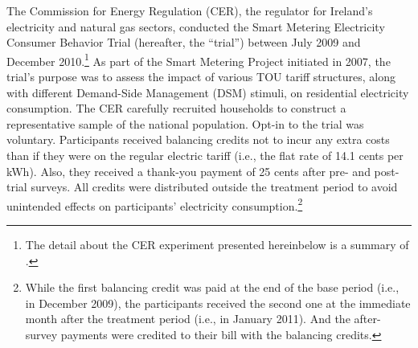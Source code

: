 The Commission for Energy Regulation (CER), the regulator for Ireland's electricity and natural gas sectors, conducted the Smart Metering Electricity Consumer Behavior Trial (hereafter, the ``trial'') between July 2009 and December 2010.\footnote{The detail about the CER experiment presented hereinbelow is a summary of \cite{Electricity-Smart-Metering-Customer-Behaviour-Trials-Findings-Report_CER_2011}.} As part of the Smart Metering Project initiated in 2007, the trial's purpose was to assess the impact of various TOU tariff structures, along with different Demand-Side Management (DSM) stimuli, on residential electricity consumption. The CER carefully recruited households to construct a representative sample of the national population. Opt-in to the trial was voluntary. Participants received balancing credits not to incur any extra costs than if they were on the regular electric tariff (i.e., the flat rate of 14.1 cents per kWh). Also, they received a thank-you payment of 25 cents after pre- and post-trial surveys. All credits were distributed outside the treatment period to avoid unintended effects on participants' electricity consumption.\footnote{While the first balancing credit was paid at the end of the base period (i.e., in December 2009), the participants received the second one at the immediate month after the treatment period (i.e., in January 2011). And the after-survey payments were credited to their bill with the balancing credits.}

